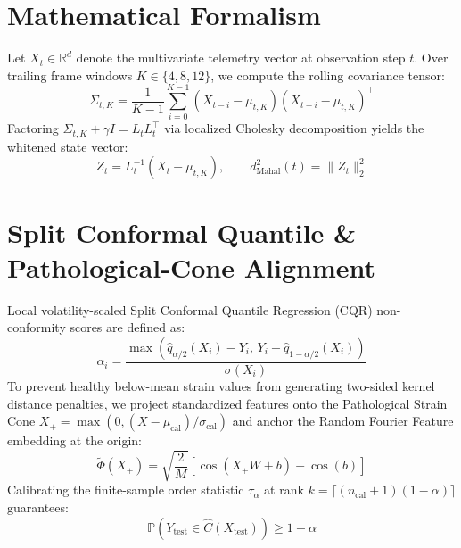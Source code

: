 \documentclass[twocolumn,10pt,journal,compsoc]{IEEEtran}
\begin{document}
\section{Mathematical Formalism}
Let $X_t \in \mathbb{R}^d$ denote the multivariate telemetry vector at observation step $t$. Over trailing frame windows $K \in \{4, 8, 12\}$, we compute the rolling covariance tensor:
\begin{equation}
\Sigma_{t, K} = \frac{1}{K-1} \sum_{i=0}^{K-1} (X_{t-i} - \mu_{t,K})(X_{t-i} - \mu_{t,K})^\top
\end{equation}
Factoring $\Sigma_{t, K} + \gamma I = L_t L_t^\top$ via localized Cholesky decomposition yields the whitened state vector:
\begin{equation}
Z_t = L_t^{-1} (X_t - \mu_{t,K}), \qquad d_{\text{Mahal}}^2(t) = \|Z_t\|_2^2
\end{equation}

\section{Split Conformal Quantile & Pathological-Cone Alignment}
Local volatility-scaled Split Conformal Quantile Regression (CQR) non-conformity scores are defined as:
\begin{equation}
\alpha_i = \frac{\max \left( \hat{q}_{\alpha/2}(X_i) - Y_i, \, Y_i - \hat{q}_{1 - \alpha/2}(X_i) \right)}{\sigma(X_i)}
\end{equation}
To prevent healthy below-mean strain values from generating two-sided kernel distance penalties, we project standardized features onto the Pathological Strain Cone $X_+ = \max(0, (X - \mu_{\text{cal}})/\sigma_{\text{cal}})$ and anchor the Random Fourier Feature embedding at the origin:
\begin{equation}
\tilde{\Phi}(X_+) = \sqrt{\frac{2}{M}}\left[\cos(X_+ W + b) - \cos(b)\right]
\end{equation}
Calibrating the finite-sample order statistic $\tau_\alpha$ at rank $k = \lceil (n_{\text{cal}}+1)(1-\alpha)\rceil$ guarantees:
\begin{equation}
\mathbb{P}\left(Y_{\text{test}} \in \hat{C}(X_{\text{test}})\right) \geq 1 - \alpha
\end{equation}
\end{document}

